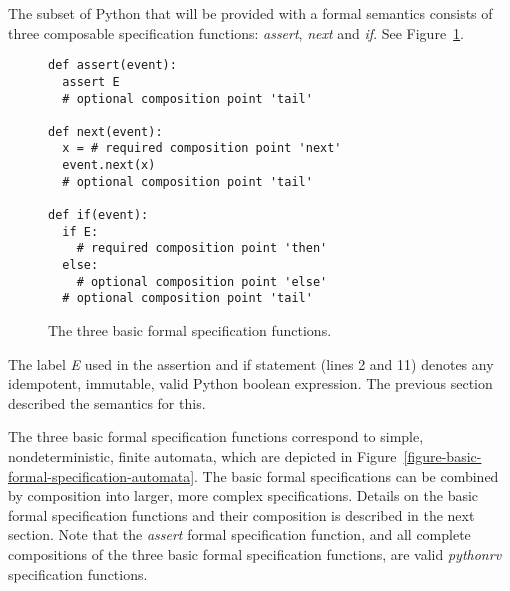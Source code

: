 \documentclass[a4paper,11pt]{kth-mag}
\begin{document}
The subset of Python that will be provided with a formal semantics consists of
three composable specification functions: \textit{assert},
\textit{next} and \textit{if}. See
Figure~\ref{figure-basic-formal-specification-functions}.

\begin{figure}[h!]
	\begin{center}
	\begin{minipage}{0.7\textwidth}
	\begin{lstlisting}
def assert(event):
  assert E
  # optional composition point 'tail'

def next(event):
  x = # required composition point 'next'
  event.next(x)
  # optional composition point 'tail'

def if(event):
  if E:
    # required composition point 'then'
  else:
    # optional composition point 'else'
  # optional composition point 'tail'
	\end{lstlisting}
	\end{minipage}
	\end{center}

	\caption{The three basic formal specification functions.}
	\label{figure-basic-formal-specification-functions}
\end{figure}

The label \textit{E} used in the assertion and if statement (lines 2 and 11)
denotes any idempotent, immutable, valid Python boolean expression. The
previous section described the semantics for this.

The three basic formal specification functions correspond to simple,
nondeterministic, finite automata, which are depicted in
Figure~\ref{figure-basic-formal-specification-automata}. The basic formal
specifications can be combined by composition into larger, more complex
specifications. Details on the basic formal specification functions and their
composition is described in the next section. Note that the \textit{assert}
formal specification function, and all complete compositions of the three basic
formal specification functions, are valid \textit{pythonrv} specification
functions.
\end{document}
